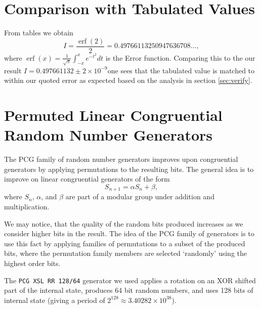 \documentclass[10pt, a4paper]{article}
\newcommand{\final}{$I = 0.497661132 \pm 2\times10^{-9}$}
\begin{document}
{}


\appendix{}

\section{Comparison with Tabulated Values}
\label{app:cheat}
From tables we obtain
\begin{equation}
I = \frac{\operatorname{erf}(2)}{2} = 0.49766113250947636708 \dots,
\end{equation}
where $\operatorname{erf}(x) = \frac{1}{\sqrt\pi}\int_{-x}^x e^{-t^2} dt$ is the Error function. Comparing
this to the our result \final one sees that the tabulated value is matched to within our
quoted error as expected based on the analysis in section \ref{sec:verify}.

\section{Permuted Linear Congruential Random Number Generators}
\label{app:pcg}

The PCG family of random number generators improves upon congruential generators by applying
permutations to the resulting bits\cite{pcg}. The general idea is to improve on linear congruential
generators of the form
\begin{equation}
S_{n+1} = \alpha S_n + \beta,
\end{equation}
where $S_n$, $\alpha$, and $\beta$ are part of a modular group under addition and multiplication.

We may notice, that the quality of the random bits produced increases as we consider higher bits
in the result\cite{pcg}. The idea of the PCG family of generators is to use this fact by
applying families of permutations to a subset of the produced bits, where the permutation family
members are selected `randomly' using the highest order bits.

The \texttt{PCG XSL RR 128/64} generator we used applies a rotation on an XOR shifted part of the
internal state, produces 64 bit random numbers, and uses 128 bits of internal state (giving a
period of $2^{128} \approx 3.40282\times10^{38}$)\cite{pcg}.
\end{document}
